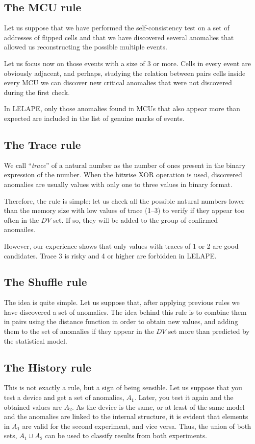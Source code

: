 \subsection{The MCU rule}
%
Let us suppose that we have performed the self-consistency test on a set of addresses of flipped cells and that we have discovered several anomalies that allowed us reconstructing the possible multiple events. 

Let us focus now on those events with a size of 3 or more. Cells in every event are obviously adjacent, and perhaps, studying the relation between pairs cells inside every MCU we can discover new critical anomalies that were not discovered during the first check.

In LELAPE, only those anomalies found in MCUs that also appear more than expected are included in the list of genuine marks of events.
%
\subsection{The Trace rule}\label{Subsec:TraceRule}
% 
We call ``\textit{trace}'' of a natural number as the number of ones present in the binary expression of the number. When the bitwise XOR operation is used, discovered anomalies are usually values with only one to three values in binary format. 

Therefore, the rule is simple: let us check all the possible natural numbers lower than the memory size with low values of trace (1--3) to verify if they appear too often in the \(DV\) set. If so, they will be added to the group of confirmed anomailes. 

However, our experience shows that only values with traces of 1 or 2 are good candidates. Trace 3 is risky and 4 or higher are forbidden in LELAPE.
%
\subsection{The Shuffle rule}\label{Subsec:ShuffleRule}
%
The idea is quite simple. Let us suppose that, after applying previous rules we have discovered a set of anomalies. The idea behind this rule is to combine them in pairs using the distance function in order to obtain new values, and adding them to the set of anomalies if they appear in the \(DV\) set more than predicted by the statistical model.
%
\subsection{The History rule}
%
This is not exactly a rule, but a sign of being sensible. Let us suppose that you test a device and get a set of anomalies, \(A_1\). Later, you test it again and the obtained values are \(A_2\). As the device is the same, or at least of the same model and the anomalies are linked to the internal structure, it is evident that elements in \(A_1\) are valid for the second experiment, and vice versa. Thus, the union of both sets, \(A_1 \cup A_2\) can be used to classify results from both experiments.

